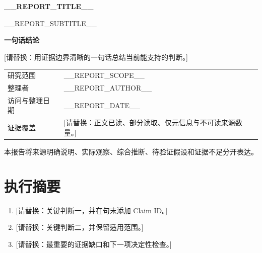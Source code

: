 \documentclass[UTF8,fontset=fandol,zihao=-4]{ctexart}
\newcommand{\ReportTitle}{__REPORT_TITLE__}
\newcommand{\ReportSubtitle}{__REPORT_SUBTITLE__}
\newcommand{\ReportAuthor}{__REPORT_AUTHOR__}
\newcommand{\ReportDate}{__REPORT_DATE__}
\newcommand{\ReportScope}{__REPORT_SCOPE__}
\newcommand{\ReportPlaceholder}[1]{\textcolor{redbrown}{[请替换：#1]}}
\begin{document}
\hypersetup{pageanchor=false}

\begin{titlepage}
\thispagestyle{empty}
\vspace*{5mm}
\begin{tcolorbox}[
  enhanced,colback=navy,colframe=navy,boxrule=0pt,arc=1.5mm,
  left=9mm,right=9mm,top=11mm,bottom=11mm,
  borderline south={2.5pt}{0pt}{blue}
]
{\color{white}\sffamily\bfseries\fontsize{23}{31}\selectfont
\ReportTitle\par}
\vspace{3mm}
{\color{white}\sffamily\fontsize{14}{21}\selectfont
\ReportSubtitle\par}
\end{tcolorbox}

\vspace{16mm}
\begin{summarybox}
{\sffamily\bfseries\color{navy}一句话结论}\par
\ReportPlaceholder{用证据边界清晰的一句话总结当前能支持的判断。}
\end{summarybox}

\vspace{8mm}
\begin{tabularx}{\textwidth}{L{30mm}Y}
\textcolor{muted}{研究范围} & \ReportScope\\
\textcolor{muted}{整理者} & \ReportAuthor\\
\textcolor{muted}{访问与整理日期} & \ReportDate\\
\textcolor{muted}{证据覆盖} & \ReportPlaceholder{正文已读、部分读取、仅元信息与不可读来源数量。}\\
\end{tabularx}

\vfill
{\sffamily\small\color{muted}
本报告将来源明确说明、实际观察、综合推断、待验证假设和证据不足分开表达。}
\end{titlepage}

\hypersetup{pageanchor=true}
\tableofcontents
\clearpage

\section{执行摘要}

\begin{summarybox}
\begin{enumerate}
  \item \ReportPlaceholder{关键判断一，并在句末添加 Claim ID。}
  \item \ReportPlaceholder{关键判断二，并保留适用范围。}
  \item \ReportPlaceholder{最重要的证据缺口和下一项决定性检查。}
\end{enumerate}
\end{summarybox}
\end{document}
